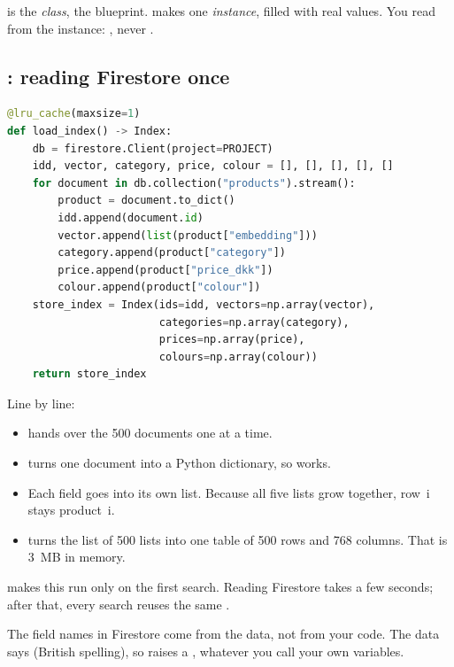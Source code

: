 \documentclass[11pt]{article}
\begin{document}
 is the \emph{class}, the blueprint.  makes one \emph{instance}, filled with real values. You
read from the instance: , never
.

\subsection{: reading Firestore once}

\begin{lstlisting}[language=Python]
@lru_cache(maxsize=1)
def load_index() -> Index:
    db = firestore.Client(project=PROJECT)
    idd, vector, category, price, colour = [], [], [], [], []
    for document in db.collection("products").stream():
        product = document.to_dict()
        idd.append(document.id)
        vector.append(list(product["embedding"]))
        category.append(product["category"])
        price.append(product["price_dkk"])
        colour.append(product["colour"])
    store_index = Index(ids=idd, vectors=np.array(vector),
                        categories=np.array(category),
                        prices=np.array(price),
                        colours=np.array(colour))
    return store_index
\end{lstlisting}

Line by line:
\begin{itemize}[leftmargin=1.4em, itemsep=2pt]
\item {} hands over the 500
  documents one at a time.
\item {} turns one document into a Python
  dictionary, so  works.
\item Each field goes into its own list. Because all five lists grow
  together, row~i stays product~i.
\item {} turns the list of 500 lists into one
  table of 500 rows and 768 columns. That is 3~MB in memory.
\end{itemize}

 makes this run only on the first search. Reading
Firestore takes a few seconds; after that, every search reuses the same
.

\begin{keypoint}
The field names in Firestore come from the data, not from your code.
The data says  (British spelling), so
 raises a , whatever you call your
own variables.
\end{keypoint}
\end{document}
